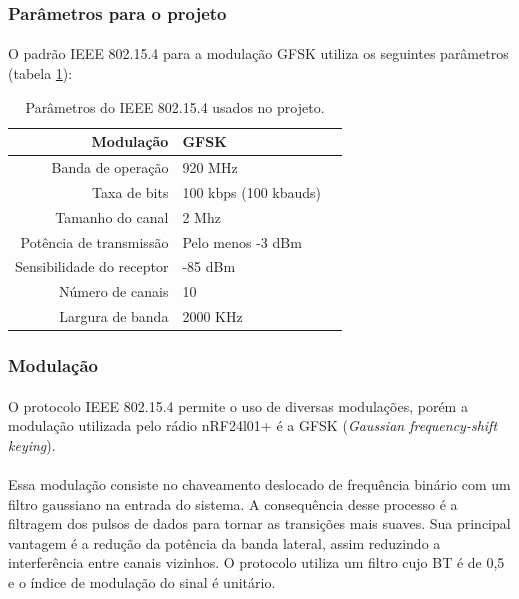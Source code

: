  \subsubsection{Parâmetros para o projeto}
 \paragraph{} O padrão IEEE 802.15.4 para a modulação GFSK utiliza os seguintes parâmetros (tabela \ref{tab:tabela1}):
 
\begin{table}[ht]
\centering
\caption{Parâmetros do IEEE 802.15.4 usados no projeto.}
\vspace{0.5cm}
\begin{tabular}{r|lr}
 
Modulação & GFSK \\
\hline
Banda de operação & 920 MHz \\
Taxa de bits & 100 kbps (100 kbauds) \\
Tamanho do canal & 2 Mhz \\
Potência de transmissão & Pelo menos -3 dBm \\
Sensibilidade do receptor & -85 dBm \\
Número de canais & 10 \\
Largura de banda & 2000 KHz 
 
\end{tabular}
\label{tab:tabela1}
\end{table}
 
\subsubsection{Modulação}
\paragraph{} O protocolo IEEE 802.15.4 permite o uso de diversas modulações, porém a modulação utilizada pelo rádio nRF24l01+ é a GFSK (\textit{Gaussian frequency-shift keying}).

\paragraph{} Essa modulação consiste no chaveamento deslocado de frequência binário com um filtro gaussiano na entrada do sistema. A consequência desse processo é a filtragem dos pulsos de dados para tornar as transições mais suaves. Sua principal vantagem é a redução da potência da banda lateral, assim reduzindo a interferência entre canais vizinhos. O protocolo utiliza um filtro cujo BT é de 0,5 e o índice de modulação do sinal é unitário.

